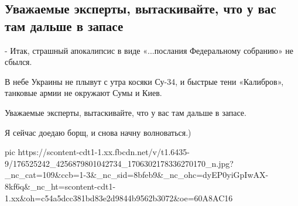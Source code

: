  
 
 
 
 
\subsection{Уважаемые эксперты, вытаскивайте, что у вас там дальше в запасе}

- Итак, страшный апокалипсис в виде «...послания Федеральному собранию» не сбылся.

В небе Украины не плывут с утра косяки Су-34, и быстрые тени «Калибров», танковые армии не окружают Сумы и Киев. 

Уважаемые эксперты, вытаскивайте, что у вас там дальше в запасе. 

Я сейчас доедаю борщ, и снова начну волноваться.)

\ifcmt
  pic https://scontent-cdt1-1.xx.fbcdn.net/v/t1.6435-9/176525242_4256879801042734_1706302178336270170_n.jpg?_nc_cat=109&ccb=1-3&_nc_sid=8bfeb9&_nc_ohc=dyEP0yiGpIwAX-8kf6q&_nc_ht=scontent-cdt1-1.xx&oh=c54a5dcc381bd83e2d9844b9562b3072&oe=60A8AC16
\fi

